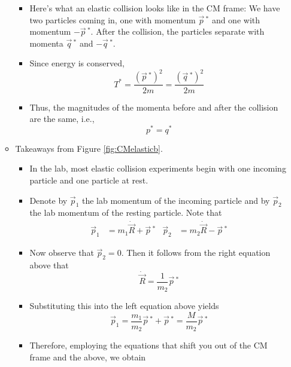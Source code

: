 \documentclass[../notes.tex]{subfiles}
\begin{document}
\begin{itemize}
\begin{itemize}
\begin{itemize}
            \item Here's what an elastic collision looks like in the CM frame: We have two particles coming in, one with momentum $\vec{p}{\,}^*$ and one with momentum $-\vec{p}{\,}^*$. After the collision, the particles separate with momenta $\vec{q}{\,}^*$ and $-\vec{q}{\,}^*$.
            \item Since energy is conserved,
            \begin{equation*}
                T^* = \frac{(\vec{p}{\,}^*)^2}{2m} = \frac{(\vec{q}{\,}^*)^2}{2m}
            \end{equation*}
            \item Thus, the magnitudes of the momenta before and after the collision are the same, i.e.,
            \begin{equation*}
                p^* = q^*
            \end{equation*}
        \end{itemize}
        \item Takeaways from Figure \ref{fig:CMelasticb}.
        \begin{itemize}
            \item In the lab, most elastic collision experiments begin with one incoming particle and one particle at rest.
            \item Denote by $\vec{p}_1$ the lab momentum of the incoming particle and by $\vec{p}_2$ the lab momentum of the resting particle. Note that
            \begin{align*}
                \vec{p}_1 &= m_1\dot{\vec{R}}+\vec{p}{\,}^*&
                \vec{p}_2 &= m_2\dot{\vec{R}}-\vec{p}{\,}^*
            \end{align*}
            \item Now observe that $\vec{p}_2=0$. Then it follows from the right equation above that
            \begin{equation*}
                \dot{\vec{R}} = \frac{1}{m_2}\vec{p}{\,}^*
            \end{equation*}
            \item Substituting this into the left equation above yields
            \begin{equation*}
                \vec{p}_1 = \frac{m_1}{m_2}\vec{p}{\,}^*+\vec{p}{\,}^* = \frac{M}{m_2}\vec{p}{\,}^*
            \end{equation*}
            \item Therefore, employing the equations that shift you out of the CM frame and the above, we obtain

\end{itemize}
\end{itemize}
\end{itemize}
\end{document}
